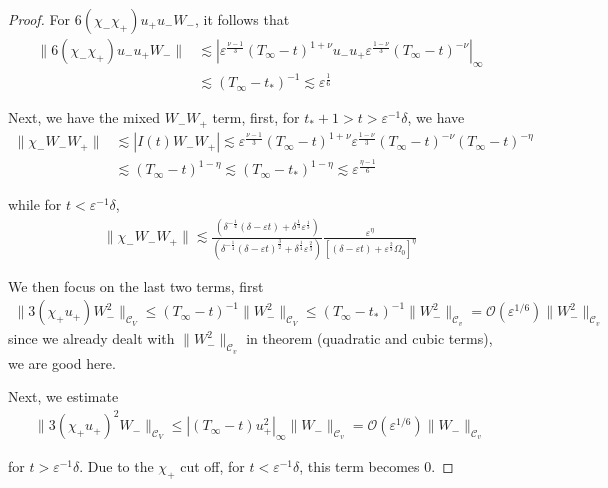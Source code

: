 \documentclass[letterpaper,11pt]{article}
\newcommand{\rmO}{\mathcal{O}}
\newcommand{\eps}{\varepsilon}
\newcommand{\lar}{ \lesssim }
\numberwithin{equation}{section}
\theoremstyle{plain}
\begin{document}
\begin{enumerate}
\begin{itemize}
\begin{enumerate}
\begin{proof}
For $6(\chi_-\chi_+)u_+u_-W_-$, it follows that
\begin{align*}
\|6(\chi_-\chi_+)u_-u_+W_- \| &\lar |\eps^{\frac{\nu-1}{3}} (T_\infty-t)^{1+\nu}u_-u_+ \eps^{\frac{1-\nu}{3}}(T_\infty-t)^{-\nu} |_{\infty} \\
& \lar (T_\infty-t_*)^{-1} \lar \eps^{\frac{1}{6}}
\end{align*}

Next, we have the mixed $W_-W_+$ term, first, 
for $t_*+1> t >\eps^{-1}\delta$, we have
\begin{align*}
\|\chi_-W_- W_+ \| &\lar |I(t)W_-W_+| \lar \eps^{\frac{\nu-1}{3}} (T_\infty-t)^{1+\nu} \eps^{\frac{1-\nu}{3}} (T_\infty-t)^{-\nu} (T_\infty-t)^{-\eta} \\
& \lar (T_\infty-t)^{1-\eta} \lar (T_\infty-t_*)^{1-\eta} \lar \eps^{\frac{\eta-1}{6}}
\end{align*}

while for $t < \eps^{-1}\delta$, 
\begin{align*}
\|\chi_-W_- W_+ \| \lar \frac{\left( \delta^{-\frac{1}{4}}(\delta-\eps t)+\delta^{\frac{1}{4}}\eps^{\frac{1}{3}} \right) }{\left(\delta^{-\frac{1}{4}}(\delta-\eps t)^{\frac{3}{2}} +\delta^{\frac{1}{4}} \eps^{\frac{2}{3}} \right)} \frac{\eps^{\eta}}{[(\delta-\eps t)+\eps^{\frac{2}{3}}\Omega_0]^{\eta}}
\end{align*}

We then focus on the last two terms, first
\begin{align*}
\|3(\chi_+u_+)W_-^2\|_{\mathcal{C}_V} \le (T_\infty -t)^{-1} \|W_-^2\|_{\mathcal{C}_V} \le (T_\infty - t_*)^{-1} \|W_-^2\|_{\mathcal{C}_v} =\rmO(\eps^{1/6})  \|W_-^2\|_{\mathcal{C}_v}
\end{align*}
since we already dealt with $\|W_-^2\|_{\mathcal{C}_v}$ in theorem (quadratic and cubic terms), we are good here.

Next, we estimate
\begin{align*}
\|3(\chi_+u_+)^2W_-\|_{\mathcal{C}_V} \le |(T_\infty - t)u_+^2|_\infty \|W_-\|_{\mathcal{C}_v} =\rmO(\eps^{1/6})\|W_-\|_{\mathcal{C}_v}
\end{align*}

for $t>\eps^{-1}\delta$. Due to the $\chi_+$ cut off, for $t<\eps^{-1}\delta$, this term becomes $0$.
\end{proof}
\end{enumerate}


\pagebreak

\end{itemize}
\end{enumerate}
\end{document}
